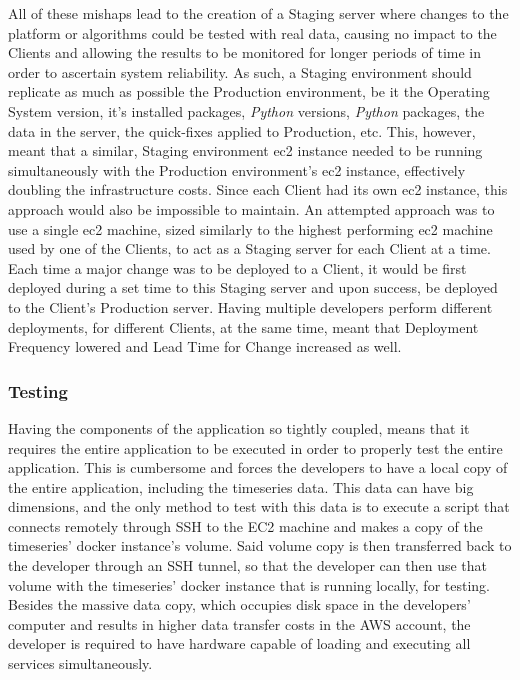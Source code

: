 All of these mishaps lead to the creation of a Staging server where changes to the platform or algorithms could be tested with real data, causing no impact to the Clients and allowing the results to be monitored for longer periods of time in order to ascertain system reliability. As such, a Staging environment should replicate as much as possible the Production environment, be it the Operating System version, it's installed packages, \textit{Python} versions, \textit{Python} packages, the data in the server, the quick-fixes applied to Production, etc.
This, however, meant that a similar, Staging environment \gls{ec2} instance needed to be running simultaneously with the Production environment's \gls{ec2} instance, effectively doubling the infrastructure costs. Since each Client had its own \gls{ec2} instance, this approach would also be impossible to maintain. An attempted approach was to use a single \gls{ec2} machine, sized similarly to the highest performing \gls{ec2} machine used by one of the Clients, to act as a Staging server for each Client at a time. Each time a major change was to be deployed to a Client, it would be first deployed during a set time to this Staging server and upon success, be deployed to the Client's Production server. Having multiple developers perform different deployments, for different Clients, at the same time, meant that Deployment Frequency lowered and Lead Time for Change increased as well.

\subsubsection{Testing}\label{methodology:sss:testing}

Having the components of the application so tightly coupled, means that it requires the entire application to be executed in order to properly test the entire application. This is cumbersome and forces the developers to have a local copy of the entire application, including the timeseries data. This data can have big dimensions, and the only method to test with this data is to execute a script that connects remotely through SSH to the EC2 machine and makes a copy of the timeseries' docker instance's volume. Said volume copy is then transferred back to the developer through an SSH tunnel, so that the developer can then use that volume with the timeseries' docker instance that is running locally, for testing. Besides the massive data copy, which occupies disk space in the developers' computer and results in higher data transfer costs in the AWS account, the developer is required to have hardware capable of loading and executing all services simultaneously.

